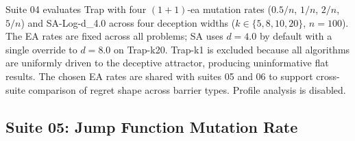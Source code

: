 %

Suite 04 evaluates Trap with four $(1+1)$-\acrshort{ea} mutation rates
($0.5/n$, $1/n$, $2/n$, $5/n$) and SA-Log-d\_4.0 across four deception widths
($k \in \{5,8,10,20\}$, $n=100$). The EA rates are fixed across all problems;
SA uses $d=4.0$ by default with a single override to $d=8.0$ on Trap-k20.
Trap-k1 is excluded because all algorithms are uniformly driven to the deceptive
attractor, producing uninformative flat results. The chosen EA rates are shared
with suites 05 and 06 to support cross-suite comparison of regret shape across
barrier types. Profile analysis is disabled.

\subsection{Suite 05: Jump Function Mutation Rate}




